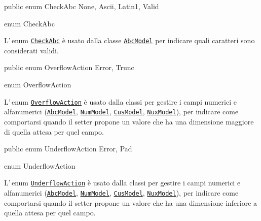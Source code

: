 \documentclass[a4paper,10pt]{report}
\newif\ifesource
\newenvironment{elisting}[1][H]
  {\captionsetup{aboveskip=0pt}\begin{listing}[#1]}
  {\end{listing}%
}
\begin{document}
\ifesource
\begin{lstlisting}[language=java, 
caption=enum CheckAbc, 
label=lst:CheckAbc]
public enum CheckAbc { None, Ascii, Latin1, Valid }
\end{lstlisting}\index{CheckAbc}
\else
\begin{elisting}
\begin{javacode}
public enum CheckAbc { None, Ascii, Latin1, Valid }
\end{javacode}
\caption{enum CheckAbc}\label{lst:CheckAbc}
\end{elisting}
\fi
L'\,enum \hyperref[lst:CheckAbc]{\texttt{CheckAbc}} è usato dalla classe
\hyperref[lst:AbcModel]{\texttt{AbcModel}} per indicare quali caratteri sono
considerati validi.

\ifesource
\begin{lstlisting}[language=java, 
caption=enum OverflowAction, 
label=lst:OverflowAction]
public enum OverflowAction { Error, Trunc }
\end{lstlisting}\index{OverflowAction}
\else
\begin{elisting}
\begin{javacode}
public enum OverflowAction { Error, Trunc }
\end{javacode}
\caption{enum OverflowAction}\label{lst:OverflowAction}
\end{elisting}
\fi
L'\,enum \hyperref[lst:OverflowAction]{\texttt{OverflowAction}} è usato dalla 
classi per gestire i campi numerici e alfanumerici 
(\hyperref[lst:AbcModel]{\texttt{AbcModel}},\break
\hyperref[lst:NumModel]{\texttt{NumModel}},
\hyperref[lst:CusModel]{\texttt{CusModel}},
\hyperref[lst:NuxModel]{\texttt{NuxModel}}), per indicare come comportarsi
quando il setter propone un valore che ha una dimensione maggiore di quella
attesa per quel campo.

\ifesource
\begin{lstlisting}[language=java, 
caption=enum UnderflowAction, 
label=lst:UnderflowAction]
public enum UnderflowAction { Error, Pad }
\end{lstlisting}\index{UnderflowAction}
\else
\begin{elisting}
\begin{javacode}
public enum UnderflowAction { Error, Pad }
\end{javacode}
\caption{enum UnderflowAction}\label{lst:UnderflowAction}
\end{elisting}
\fi
L'\,enum \hyperref[lst:UnderflowAction]{\texttt{UnderflowAction}} è usato dalla 
classi per gestire i campi numerici e alfanumerici 
(\hyperref[lst:AbcModel]{\texttt{AbcModel}},\break
\hyperref[lst:NumModel]{\texttt{NumModel}},
\hyperref[lst:CusModel]{\texttt{CusModel}},
\hyperref[lst:NuxModel]{\texttt{NuxModel}}), per indicare come comportarsi
quando il setter propone un valore che ha una dimensione inferiore a quella
attesa per quel campo.
\end{document}
